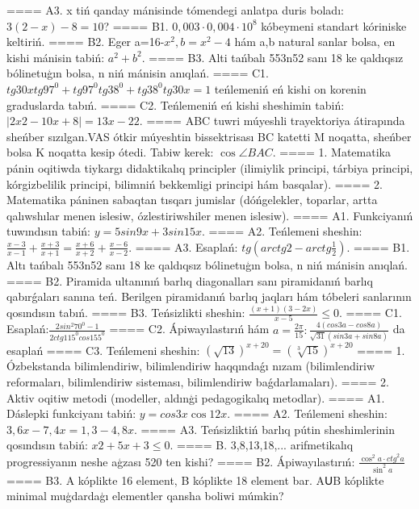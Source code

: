 ====
A3. x tiń qanday mánisinde tómendegi anlatpa duris boladı: \(3 (2 - x) - 8 = 10\)?
====
B1. \(0,003 \cdot 0,004 \cdot 10^{8}\) kóbeymeni standart kóriniske keltiriń.
====
B2. Eger a=16-\(x^2, b=x^2 - 4\) hám a,b natural sanlar bolsa, en kishi mánisin tabiń: \(a^2 + b^2\).
====
B3. Alti tańbalı 553n52 sanı 18 ke qaldıqsız bólinetuģın bolsa, n niń mánisin anıqlań.
====
C1. \(tg30xtg97^{0} + tg97^{0}tg38^{0} + tg38^{0}tg30x = 1\) teńlemeniń eń kishi on korenin graduslarda tabıń.
====
C2. Teńlemeniń eń kishi sheshimin tabiń: \(\left| 2x2 - 10x + 8 \right| = 13x - 22\).
====
ABC tuwri múyeshli trayektoriya átirapında sheńber sızılgan.VAS ótkir múyeshtin bissektrisası BC katetti M noqatta, sheńber bolsa K noqatta kesip ótedi. Tabiw kerek: \(\cos\angle BAC\).
====
1. Matematika pánin oqitiwda tiykargı didaktikalıq principler (ilimiylik principi, tárbiya principi, kórgizbelilik principi, bilimniń bekkemligi principi hám basqalar).
====
2. Matematika páninen sabaqtan tısqarı jumislar (dóńgelekler, toparlar, artta qalıwshılar menen islesiw, ózlestiriwshiler menen islesiw).
====
A1. Funkciyanıń tuwındısın tabiń: \(y = 5 sin 9x + 3 sin 15x\).
====
A2. Teńlemeni sheshin: \(\frac{x - 3}{x - 1} + \frac{x + 3}{x + 1} = \frac{x + 6}{x + 2} + \frac{x - 6}{x - 2}\).
====
A3. Esaplań: \(tg\left(arctg2 - arctg\frac{1}{2} \right) \).
====
B1. Altı tańbalı 553n52 sanı 18 ke qaldıqsız bólinetuģın bolsa, n niń mánisin anıqlań.
====
B2. Piramida ultanınıń barlıq diagonalları sanı piramidanıń barlıq qabırǵaları sanına teń. Berilgen piramidanıń barlıq jaqları hám tóbeleri sanlarının qosındısın tabıń.
====
B3. Teńsizlikti sheshin: \(\frac{ (x + 1) (3 - 2x) }{x - 5} \leq 0\).
====
C1. Esaplań:\(\frac{2sin^{2}70^{0} - 1}{2ctg115^{0}cos155^{0}}\)
====
C2. Ápiwayılastırıń hám \(a = \frac{2\pi}{15}:\frac{4 (cos3a - cos8a) }{\sqrt{31} (sin3a + sin8a) }\) da esaplań
====
C3. Teńlemeni sheshin: \((\sqrt{13}) ^{x + 20} = (\sqrt[3]{15}) ^{x + 20}\)
====
1. Ózbekstanda bilimlendiriw, bilimlendiriw haqqındaǵı nızam (bilimlendiriw reformaları, bilimlendiriw sisteması, bilimlendiriw baǵdarlamaları).
====
2. Aktiv oqitiw metodi (modeller, aldınģi pedagogikalıq metodlar).
====
A1. Dáslepki funkciyanı tabiń: \(y=cos{3x}\cos{12x}\).
====
A2. Teńlemeni sheshin: \(3,6x - 7,4x = 1,3 - 4,8x\).
====
A3. Teńsizliktiń barlıq pútin sheshimlerinin qosındısın tabiń: \(x2 + 5x + 3 \leq 0\).
====
B. 3,8,13,18,... arifmetikalıq progressiyanın neshe aģzası 520 ten kishi?
====
B2. Ápiwayılastırıń: \(\frac{\cos^{2}a \cdot {ctg}^{2}a}{\sin^{2}a}\)
====
B3. A kóplikte 16 element, B kóplikte 18 element bar. AՍB kóplikte minimal muģdardaģı elementler qansha boliwi múmkin?
